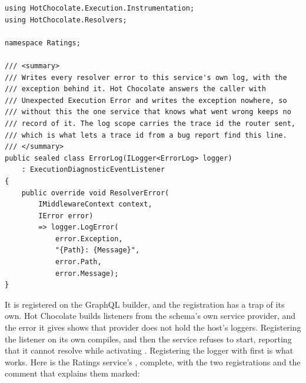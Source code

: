 \begin{verbatim}
using HotChocolate.Execution.Instrumentation;
using HotChocolate.Resolvers;

namespace Ratings;

/// <summary>
/// Writes every resolver error to this service's own log, with the
/// exception behind it. Hot Chocolate answers the caller with
/// Unexpected Execution Error and writes the exception nowhere, so
/// without this the one service that knows what went wrong keeps no
/// record of it. The log scope carries the trace id the router sent,
/// which is what lets a trace id from a bug report find this line.
/// </summary>
public sealed class ErrorLog(ILogger<ErrorLog> logger)
    : ExecutionDiagnosticEventListener
{
    public override void ResolverError(
        IMiddlewareContext context,
        IError error)
        => logger.LogError(
            error.Exception,
            "{Path}: {Message}",
            error.Path,
            error.Message);
}
\end{verbatim}

%
It is registered on the GraphQL builder, and the registration has a trap of
its own. Hot Chocolate builds listeners from the schema's own service
provider, and the error it gives shows that provider does not hold the host's
loggers. Registering the listener on its own compiles, and then
the service refuses to start, reporting that it cannot
resolve  while activating .
Registering the logger with  first is what works. Here is the Ratings
service's , complete, with the two registrations and the
comment that explains them marked:

